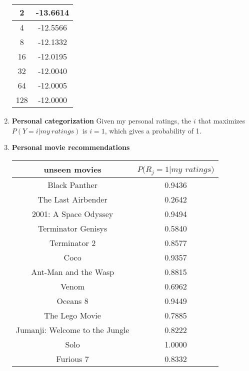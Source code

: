 \documentclass[11]{article}
\begin{document}
\begin{enumerate}[label=(\alph*)]
\begin{center}
\begin{tabular}{|c|c|}
2                  & -13.6614                    \\ \hline
4                  & -12.5566                    \\ \hline
8                  & -12.1332                    \\ \hline
16                 & -12.0195                   \\ \hline
32                 & -12.0040                    \\ \hline
64                 & -12.0005                    \\ \hline
128                & -12.0000                    \\ \hline
\end{tabular}
\end{center}
\item{\textbf{Personal categorization}}
Given my personal ratings, the $i$ that maximizes $P(Y=i|my\ ratings)$ is $i=1$, which gives a probability of 1.

\item{\textbf{Personal movie  recommendations}}
\begin{center}
\centering
\begin{tabular}{|c|c|}
\hline
\textbf{unseen movies}         & \textbf{$P(R_j=1|my$ $ratings)$} \\ \hline
Black Panther                  & 0.9436                         \\ \hline
The Last Airbender             & 0.2642                         \\ \hline
2001: A Space Odyssey          & 0.9494                         \\ \hline
Terminator Genisys             & 0.5840                         \\ \hline
Terminator 2                   & 0.8577                         \\ \hline
Coco                           & 0.9357                         \\ \hline
Ant-Man and the Wasp           & 0.8815                         \\ \hline
Venom                          & 0.6962                         \\ \hline
Oceans 8                       & 0.9449                         \\ \hline
The Lego Movie                 & 0.7885                         \\ \hline
Jumanji: Welcome to the Jungle & 0.8222                         \\ \hline
Solo                           & 1.0000                         \\ \hline
Furious 7                      & 0.8332                         \\ \hline
\end{tabular}
\end{center}


\end{enumerate}
\end{document}
